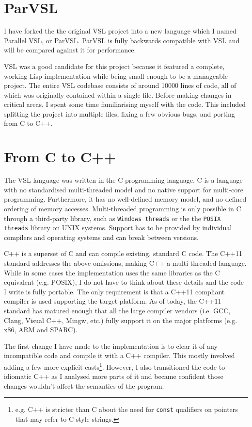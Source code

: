 \section{ParVSL}
I have forked the the original VSL project into a new language which I named Parallel VSL, or ParVSL.
ParVSL is fully backwards compatible with VSL and will be compared against it for performance.

VSL was a good candidate for this project because it featured a complete, working Lisp implementation while being
small enough to be a manageable project. The entire VSL codebase consists of around 10000 lines of code, all of which
was originally contained within a single file. Before making changes in critical areas, I spent some time familiarising
myself with the code. This included splitting the project into multiple files, fixing a few obvious bugs, and porting
from C to C++.

\section{From C to C++}
The VSL language was written in the C programming language. C is a language with no standardised
multi-threaded model and no native support for multi-core programming. Furthermore, it has no well-defined
memory model, and no defined ordering of memory accesses. Multi-threaded programming
is only possible in C through a third-party library, such as \texttt{Windows threads} or the
the \texttt{POSIX threads} library on UNIX systems. Support has to be provided by individual compilers
and operating systems and can break between versions.

C++ is a superset of C and can compile existing, standard C code. The C++11 standard addresses the
above omissions, making C++ a multi-threaded language. While in some cases the implementation uses the same
libraries as the C equivalent (e.g. POSIX), I do not have to think about these details and the code
I write is fully portable. The only requirement is that a C++11 compliant compiler is used supporting
the target platform. As of today, the C++11 standard has matured enough
that all the large compiler vendors (i.e. GCC, Clang, Visual C++, Mingw, etc.) fully support it on the
major platforms (e.g. x86, ARM and SPARC).

The first change I have made to the implementation is to clear it of any incompatible code and compile it
with a C++ compiler. This mostly involved adding a few more explicit casts\footnote{e.g.
C++ is stricter than C about the need for \texttt{const} qualifiers on pointers that
may refer to C-style strings.}.
However, I also transitioned the code to idiomatic C++ as I analysed more parts of it
and became confident those changes wouldn't affect the semantics of the program.

